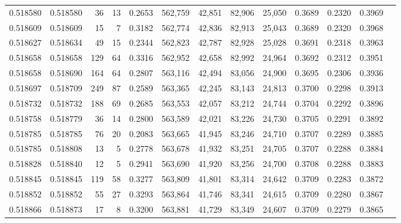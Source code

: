 \begin{tabular}{rrrrrrrrrrrrr}
0.518580 & 0.518580 &    36 &    13 &                                     0.2653 & 562,759 &  42,851 &  82,906 &  25,050 & 0.3689 & 0.2320 & 0.3969 \\
0.518609 & 0.518609 &    15 &     7 &                                     0.3182 & 562,774 &  42,836 &  82,913 &  25,043 & 0.3689 & 0.2320 & 0.3968 \\
0.518627 & 0.518634 &    49 &    15 &                                     0.2344 & 562,823 &  42,787 &  82,928 &  25,028 & 0.3691 & 0.2318 & 0.3963 \\
0.518658 & 0.518658 &   129 &    64 &                                     0.3316 & 562,952 &  42,658 &  82,992 &  24,964 & 0.3692 & 0.2312 & 0.3951 \\
0.518658 & 0.518690 &   164 &    64 &                                     0.2807 & 563,116 &  42,494 &  83,056 &  24,900 & 0.3695 & 0.2306 & 0.3936 \\
0.518697 & 0.518709 &   249 &    87 &                                     0.2589 & 563,365 &  42,245 &  83,143 &  24,813 & 0.3700 & 0.2298 & 0.3913 \\
0.518732 & 0.518732 &   188 &    69 &                                     0.2685 & 563,553 &  42,057 &  83,212 &  24,744 & 0.3704 & 0.2292 & 0.3896 \\
0.518758 & 0.518779 &    36 &    14 &                                     0.2800 & 563,589 &  42,021 &  83,226 &  24,730 & 0.3705 & 0.2291 & 0.3892 \\
0.518785 & 0.518785 &    76 &    20 &                                     0.2083 & 563,665 &  41,945 &  83,246 &  24,710 & 0.3707 & 0.2289 & 0.3885 \\
0.518785 & 0.518808 &    13 &     5 &                                     0.2778 & 563,678 &  41,932 &  83,251 &  24,705 & 0.3707 & 0.2288 & 0.3884 \\
0.518828 & 0.518840 &    12 &     5 &                                     0.2941 & 563,690 &  41,920 &  83,256 &  24,700 & 0.3708 & 0.2288 & 0.3883 \\
0.518845 & 0.518845 &   119 &    58 &                                     0.3277 & 563,809 &  41,801 &  83,314 &  24,642 & 0.3709 & 0.2283 & 0.3872 \\
0.518852 & 0.518852 &    55 &    27 &                                     0.3293 & 563,864 &  41,746 &  83,341 &  24,615 & 0.3709 & 0.2280 & 0.3867 \\
0.518866 & 0.518873 &    17 &     8 &                                     0.3200 & 563,881 &  41,729 &  83,349 &  24,607 & 0.3709 & 0.2279 & 0.3865 \\

\end{tabular}
